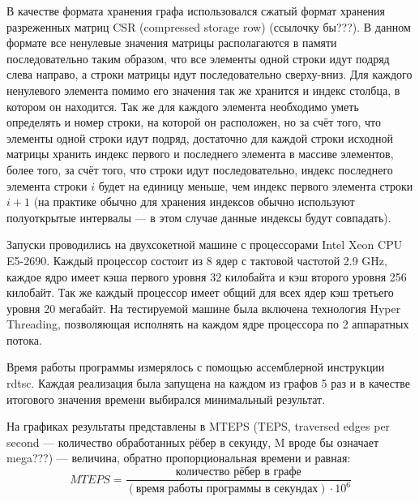 \documentclass[a4paper,10pt]{extarticle}
\begin{document}
В качестве формата хранения графа использовался сжатый формат хранения разреженных матриц CSR (compressed storage row) (ссылочку бы???). В данном формате все ненулевые значения матрицы располагаются в памяти последовательно таким образом, что все элементы одной строки идут подряд слева направо, а строки матрицы идут последовательно сверху-вниз. 
Для каждого ненулевого элемента помимо его значения так же хранится и индекс столбца, в котором он находится. 
Так же для каждого элемента необходимо уметь определять и номер строки, на которой он расположен, но за счёт того, что элементы одной строки идут подряд, достаточно для каждой строки исходной матрицы хранить индекс первого и последнего элемента в массиве элементов, более того, за счёт того, что строки идут последовательно, индекс последнего элемента строки $i$ будет на единицу меньше, чем индекс первого элемента строки $i+1$ (на практике обычно для хранения индексов обычно используют полуоткрытые интервалы --- в этом случае данные индексы будут совпадать).

Запуски проводились на двухсокетной машине с процессорами Intel Xeon CPU E5-2690. Каждый процессор состоит из 8 ядер с тактовой частотой 2.9 GHz, каждое ядро имеет кэша первого уровня 32 килобайта и   кэш второго уровня 256 килобайт. Так же каждый процессор имеет общий для всех ядер кэш третьего уровня 20 мегабайт.
На тестируемой машине была включена технология Hyper Threading, позволяющая исполнять на каждом ядре процессора по 2 аппаратных потока.

Время работы программы измерялось с помощью ассемблерной инструкции rdtsc.
Каждая реализация была запущена на каждом из графов 5 раз и в качестве итогового значения времени выбирался минимальный результат. 

На графиках результаты представлены в MTEPS (TEPS, traversed edges per second --- количество обработанных рёбер в секунду, M вроде бы означает mega???) --- величина, обратно пропорциональная времени и равная:
$$MTEPS = \frac{\texttt{количество рёбер в графе}}{(\texttt{время работы программы в секундах}) \cdot 10^6}$$



\end{document}
